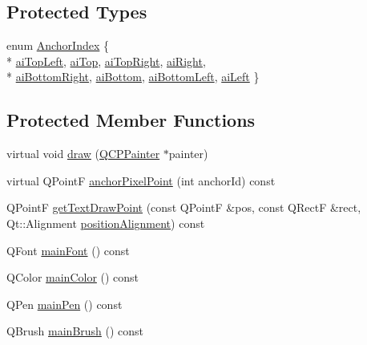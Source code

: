 \subsection*{Protected Types}
\begin{DoxyCompactItemize}
\item 
enum \hyperlink{class_q_c_p_item_text_a14a84e58f72519c8ae1d7a4a1dd23f21}{Anchor\+Index} \{ \\*
\hyperlink{class_q_c_p_item_text_a14a84e58f72519c8ae1d7a4a1dd23f21a30342ee15065715f045cb52eb77b904c}{ai\+Top\+Left}, 
\hyperlink{class_q_c_p_item_text_a14a84e58f72519c8ae1d7a4a1dd23f21a55ce9699c71db6d264eb669bb0eb9aff}{ai\+Top}, 
\hyperlink{class_q_c_p_item_text_a14a84e58f72519c8ae1d7a4a1dd23f21a7b6ff56fcad4c78db0b793a96fce9580}{ai\+Top\+Right}, 
\hyperlink{class_q_c_p_item_text_a14a84e58f72519c8ae1d7a4a1dd23f21ad4faa7def46db6df2fedd1926237b48f}{ai\+Right}, 
\\*
\hyperlink{class_q_c_p_item_text_a14a84e58f72519c8ae1d7a4a1dd23f21af2072f259730ef47aa7ad7519f3a0255}{ai\+Bottom\+Right}, 
\hyperlink{class_q_c_p_item_text_a14a84e58f72519c8ae1d7a4a1dd23f21a5773ad69b7f4cd2724ba46d8f31b0688}{ai\+Bottom}, 
\hyperlink{class_q_c_p_item_text_a14a84e58f72519c8ae1d7a4a1dd23f21a489ec73da5a18c15e98a4f9b17ed301f}{ai\+Bottom\+Left}, 
\hyperlink{class_q_c_p_item_text_a14a84e58f72519c8ae1d7a4a1dd23f21a7f1c1b8c574c753e300a4759915a9170}{ai\+Left}
 \}
\end{DoxyCompactItemize}
\subsection*{Protected Member Functions}
\begin{DoxyCompactItemize}
\item 
virtual void \hyperlink{class_q_c_p_item_text_a8793adb271ab79b4cf391dc55e9987f1}{draw} (\hyperlink{class_q_c_p_painter}{Q\+C\+P\+Painter} $\ast$painter)
\item 
virtual Q\+Point\+F \hyperlink{class_q_c_p_item_text_ad248f988534a9d07bc7c220a2457142a}{anchor\+Pixel\+Point} (int anchor\+Id) const 
\item 
Q\+Point\+F \hyperlink{class_q_c_p_item_text_aa6e478b1ce198eace89157c4cacc3ddc}{get\+Text\+Draw\+Point} (const Q\+Point\+F \&pos, const Q\+Rect\+F \&rect, Qt\+::\+Alignment \hyperlink{class_q_c_p_item_text_af13c6adc480f268116ae72196eb44b06}{position\+Alignment}) const 
\item 
Q\+Font \hyperlink{class_q_c_p_item_text_a23d391bd6471c45e73f45add67ede902}{main\+Font} () const 
\item 
Q\+Color \hyperlink{class_q_c_p_item_text_ad7bf17e4945cc86bbf9a36331da059a0}{main\+Color} () const 
\item 
Q\+Pen \hyperlink{class_q_c_p_item_text_a9ade32d362b22853659201c738269e2a}{main\+Pen} () const 
\item 
Q\+Brush \hyperlink{class_q_c_p_item_text_a10d6585a030633aa79d5ebc5a437f183}{main\+Brush} () const 
\end{DoxyCompactItemize}
